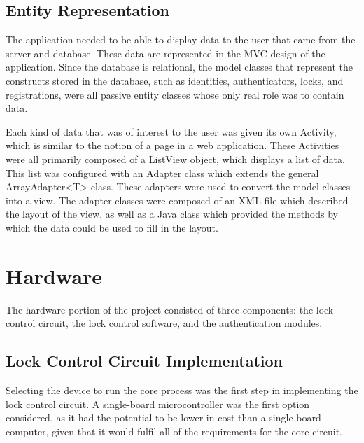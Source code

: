 \documentclass[12pt]{report}
\let\Oldsection\section
\renewcommand{\section}{\FloatBarrier\Oldsection}
\let\Oldsubsection\subsection
\renewcommand{\subsection}{\FloatBarrier\Oldsubsection}
\begin{document}

\subsection{Entity Representation} \label{entity-representation}

The application needed to be able to display data to the user that came from the server and database. These data are
represented in the MVC design of the application. Since the database is relational, the model classes that represent
the constructs stored in the database, such as identities, authenticators, locks, and registrations, were all passive
entity classes whose only real role was to contain data.

Each kind of data that was of interest to the user was given its own Activity, which is similar to the notion of a page
in a web application. These Activities were all primarily composed of a ListView object, which displays a list of data.
This list was configured with an Adapter class which extends the general ArrayAdapter<T> class. These adapters were
used to convert the model classes into a view. The adapter classes were composed of an XML file which described the
layout of the view, as well as a Java class which provided the methods by which the data could be used to fill in the
layout.


\section{Hardware} \label{hardware}

The hardware portion of the project consisted of three components: the lock control circuit, the lock control software, 
and the authentication modules.

\subsection{Lock Control Circuit Implementation} \label{section:lock-control-circuit-implementation}

Selecting the device to run the core process was the first step in implementing the lock control circuit. A 
single-board microcontroller was the first option considered, as it had the potential to be lower in cost than a 
single-board computer, given that it would fulfil all of the requirements for the core circuit.
\end{document}
